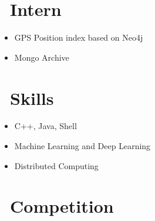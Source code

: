 \documentclass{resume}
\begin{document}
\section{\faUsers\ Intern}
\begin{itemize}
  \item GPS Position index based on Neo4j
  \item Mongo Archive
\end{itemize}


\section{\faCogs\ Skills}
\begin{itemize}[parsep=0.5ex]
  \item C++, Java, Shell
  \item Machine Learning and Deep Learning
  \item Distributed Computing
\end{itemize}

\section{\faTrophy\ Competition}

%
%
\end{document}

